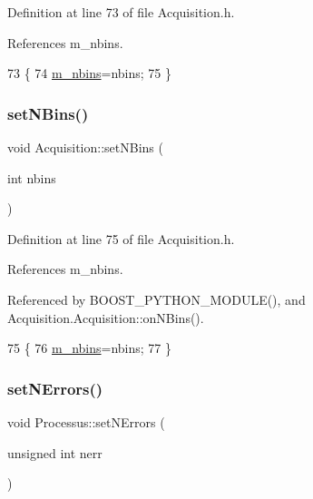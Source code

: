Definition at line 73 of file Acquisition.\+h.



References m\+\_\+nbins.


\begin{DoxyCode}
73                           \{
74     \hyperlink{classAcquisition_a05bccdc4b9ada37beaeba8794ccef12d}{m\_nbins}=nbins;
75   \}
\end{DoxyCode}
\mbox{\label{classAcquisition_a6ee040a009aa48f848b1e12434135db9}} 
\subsubsection{\texorpdfstring{set\+N\+Bins()}{setNBins()}\hspace{0.1cm}{\footnotesize\ttfamily [2/2]}}
{\footnotesize\ttfamily void Acquisition\+::set\+N\+Bins (\begin{DoxyParamCaption}\item[{int}]{nbins }\end{DoxyParamCaption})\hspace{0.3cm}{\ttfamily [inline]}}



Definition at line 75 of file Acquisition.\+h.



References m\+\_\+nbins.



Referenced by B\+O\+O\+S\+T\+\_\+\+P\+Y\+T\+H\+O\+N\+\_\+\+M\+O\+D\+U\+L\+E(), and Acquisition.\+Acquisition\+::on\+N\+Bins().


\begin{DoxyCode}
75                           \{
76     \hyperlink{classAcquisition_a05bccdc4b9ada37beaeba8794ccef12d}{m\_nbins}=nbins;
77   \}
\end{DoxyCode}
\mbox{\label{classProcessus_a831b027b9cf18ab56fa6147b5d3055da}} 
\subsubsection{\texorpdfstring{set\+N\+Errors()}{setNErrors()}}
{\footnotesize\ttfamily void Processus\+::set\+N\+Errors (\begin{DoxyParamCaption}\item[{unsigned int}]{nerr }\end{DoxyParamCaption})\hspace{0.3cm}{\ttfamily [inherited]}}

